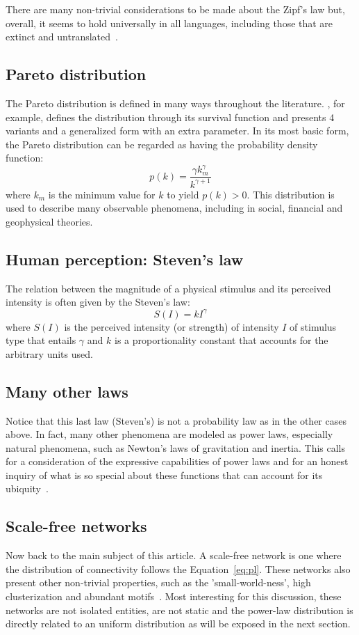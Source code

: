 \documentclass[12pt,fleqn]{article}
\begin{document}
There are many non-trivial considerations to be made
about the Zipf's law but, overall, it seems to hold universally
in all languages, including those that are extinct and untranslated~\citep{zipf}.

\subsection{Pareto distribution}
The Pareto distribution is defined in many ways throughout the literature.
\cite{paretoWikipedia}, for example, defines the distribution through
its survival function and presents 4 variants and a generalized form
with an extra parameter.
In its most basic form, the Pareto distribution can be regarded as
having the probability density function:
\begin{equation}
	p(k) = \frac{\gamma k_m^\gamma}{k^{\gamma+1}}
\end{equation}
\noindent where $k_m$ is the minimum value for $k$ to yield $p(k)>0$.
This distribution is used to describe many observable phenomena,
including in social, financial and geophysical theories.

\subsection{Human perception: Steven's law}
The relation between the magnitude of a physical stimulus and
its perceived intensity is often given by the Steven's law:
\begin{equation}
	S(I) = kI^\gamma
\end{equation}
\noindent where $S(I)$ is the perceived intensity (or strength)
of intensity $I$ of stimulus type that entails $\gamma$ and
$k$ is a proportionality constant that accounts for the arbitrary
units used.

\subsection{Many other laws}
Notice that this last law (Steven's) is not a probability law as in the other cases above.
In fact, many other phenomena are modeled as power laws, especially natural phenomena,
such as Newton's laws of gravitation and inertia. 
This calls for a consideration of the expressive capabilities of power laws and
for an honest inquiry of what is so special about these functions that
can account for its ubiquity~\citep{fabbri3}.

\subsection{Scale-free networks}
Now back to the main subject of this article.
A scale-free network is one where the distribution of connectivity
follows the Equation~\ref{eq:pl}.
These networks also present other non-trivial properties,
such as the 'small-world-ness', high clusterization and
abundant motifs~\citep{networks}.
Most interesting for this discussion, these networks are not isolated
entities, are not static and the power-law distribution is directly related to
an uniform distribution as will be exposed in the next section.
\end{document}

